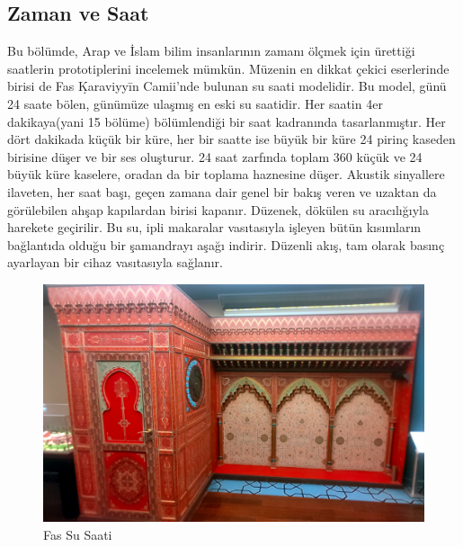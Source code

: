 \subsection{Zaman ve Saat}
\indent\indent Bu bölümde, Arap ve İslam bilim insanlarının zamanı ölçmek için ürettiği saatlerin prototiplerini incelemek mümkün. Müzenin en dikkat çekici eserlerinde birisi de Fas Ḳaraviyyīn Camii’nde bulunan su saati modelidir. Bu model, günü 24 saate bölen, günümüze ulaşmış en eski su saatidir. Her saatin 4er dakikaya(yani 15 bölüme) bölümlendiği bir saat kadranında tasarlanmıştır. Her dört dakikada küçük bir küre, her bir saatte ise büyük bir küre 24 pirinç kaseden birisine düşer ve bir ses oluşturur. 24 saat zarfında toplam 360 küçük ve 24 büyük küre kaselere, oradan da bir toplama haznesine düşer. Akustik sinyallere ilaveten, her saat başı, geçen zamana dair genel bir bakış veren ve uzaktan da görülebilen ahşap kapılardan birisi kapanır. Düzenek, dökülen su aracılığıyla harekete geçirilir. Bu su, ipli makaralar vasıtasıyla işleyen bütün kısımların bağlantıda olduğu bir şamandrayı aşağı indirir. Düzenli akış, tam olarak basınç ayarlayan bir cihaz vasıtasıyla sağlanır.\newline
\begin{figure}[H]
    \centering
    \includegraphics[width=0.95\linewidth]{assets/water_clock.jpg}
    \caption{Fas Su Saati}
\end{figure}
\newpage
